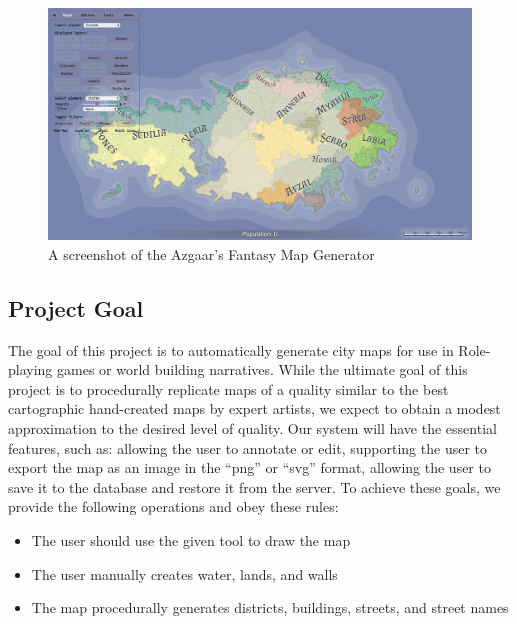 \begin{figure}[htb]
\centering
\includegraphics[width=\textwidth]{section01/assets/screenshot_FMG.png}
\caption[A screenshot of the Azgaar's Fantasy Map Generator]{\label{Screenshot FMG}A screenshot of the Azgaar's Fantasy Map Generator}
\end{figure}

\subsection{Project Goal}
The goal of this project is to automatically generate city maps for use in Role-playing games or world building narratives. While the ultimate goal of this project is to procedurally replicate maps of a quality similar to the best cartographic hand-created maps by expert artists, we expect to obtain a modest approximation to the desired level of quality. Our system will have the essential features, such as: allowing the user to annotate or edit, supporting the user to export the map as an image in the ``png'' or ``svg'' format, allowing the user to save it to the database and restore it from the server. To achieve these goals, we provide the following operations and obey these rules:
\begin{itemize}
  \item The user should use the given tool to draw the map
  \item The user manually creates water, lands, and walls
  \item The map procedurally generates districts, buildings, streets, and street names
\end{itemize}
